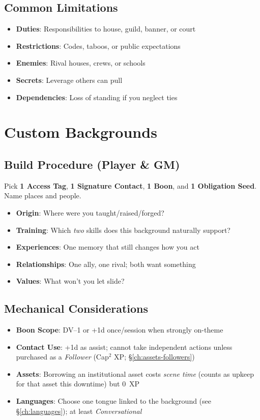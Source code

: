 \subsection*{Common Limitations}
\begin{itemize}
\item \textbf{Duties}: Responsibilities to house, guild, banner, or court
\item \textbf{Restrictions}: Codes, taboos, or public expectations
\item \textbf{Enemies}: Rival houses, crews, or schools
\item \textbf{Secrets}: Leverage others can pull
\item \textbf{Dependencies}: Loss of standing if you neglect ties
\end{itemize}

\section{Custom Backgrounds}

\subsection*{Build Procedure (Player \& GM)}
Pick \textbf{1 Access Tag}, \textbf{1 Signature Contact}, \textbf{1 Boon}, and \textbf{1 Obligation Seed}. Name places and people.
\begin{itemize}
\item \textbf{Origin}: Where were you taught/raised/forged?
\item \textbf{Training}: Which \emph{two} skills does this background naturally support?
\item \textbf{Experiences}: One memory that still changes how you act
\item \textbf{Relationships}: One ally, one rival; both want something
\item \textbf{Values}: What won't you let slide?
\end{itemize}

\subsection*{Mechanical Considerations}
\begin{itemize}
\item \textbf{Boon Scope}: DV--1 or +1d once/session when strongly on-theme
\item \textbf{Contact Use}: +1d as assist; cannot take independent actions unless purchased as a \emph{Follower} (Cap$^2$ XP; \S\ref{ch:assets-followers})
\item \textbf{Assets}: Borrowing an institutional asset costs \emph{scene time} (counts as upkeep for that asset this downtime) but \(0\)~XP
\item \textbf{Languages}: Choose one tongue linked to the background (see \S\ref{ch:languages}); at least \emph{Conversational}
\end{itemize}

